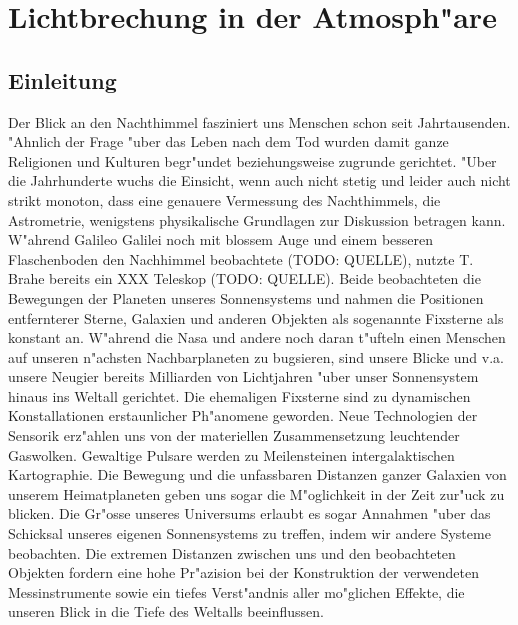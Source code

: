 \chapter{Lichtbrechung in der Atmosph"are\label{chapter:thema}}
\begin{refsection}

\printbibliography[heading=subbibliography]
\end{refsection}


\section{Einleitung}
Der Blick an den Nachthimmel fasziniert uns Menschen schon seit Jahrtausenden. "Ahnlich der Frage "uber das Leben nach dem Tod wurden damit ganze Religionen und Kulturen begr"undet beziehungsweise zugrunde gerichtet. 
"Uber die Jahrhunderte wuchs die Einsicht, wenn auch nicht stetig und leider auch nicht strikt monoton, dass eine genauere Vermessung des Nachthimmels, die Astrometrie, wenigstens physikalische Grundlagen zur Diskussion betragen kann. 
W"ahrend Galileo Galilei noch mit blossem Auge und einem besseren Flaschenboden den Nachhimmel beobachtete (TODO: QUELLE), nutzte T. Brahe bereits ein XXX Teleskop (TODO: QUELLE). 
Beide beobachteten die Bewegungen der Planeten unseres Sonnensystems und nahmen die Positionen entfernterer Sterne, Galaxien und anderen Objekten als sogenannte Fixsterne als konstant an. 
W"ahrend die Nasa und andere noch daran t"ufteln einen Menschen auf unseren n"achsten Nachbarplaneten zu bugsieren, sind unsere Blicke und v.a. unsere Neugier bereits Milliarden von Lichtjahren "uber unser Sonnensystem hinaus ins Weltall gerichtet. 
Die ehemaligen Fixsterne sind zu dynamischen Konstallationen erstaunlicher Ph"anomene geworden.
Neue Technologien der Sensorik erz"ahlen uns von der materiellen Zusammensetzung leuchtender Gaswolken. 
Gewaltige Pulsare werden zu Meilensteinen intergalaktischen Kartographie. 
Die Bewegung und die unfassbaren Distanzen ganzer Galaxien von unserem Heimatplaneten geben uns sogar die M"oglichkeit in der Zeit zur"uck zu blicken.
Die Gr"osse unseres Universums  erlaubt es sogar Annahmen "uber das Schicksal unseres eigenen Sonnensystems zu treffen, indem wir andere Systeme beobachten. 
Die extremen Distanzen zwischen uns und den beobachteten Objekten fordern eine hohe Pr"azision bei der Konstruktion der verwendeten Messinstrumente sowie ein tiefes Verst"andnis aller mo"glichen Effekte, die unseren Blick in die Tiefe des Weltalls beeinflussen. 
